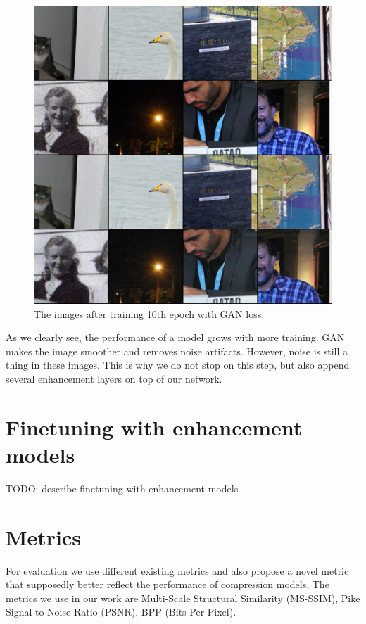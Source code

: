 \begin{figure}
    \centering
    \includegraphics[width=\textwidth]{figure/gan_14000.jpg}
    \caption{The images after training 10th epoch with GAN loss.}
    \label{gan-tenth-epoch}
\end{figure}

As we clearly see, the performance of a model grows with more training. GAN makes the image smoother and removes noise artifacts. However, noise is still a thing in these images. This is why we do not stop on this step, but also append several enhancement layers on top of our network.

\section{Finetuning with enhancement models}

TODO: describe finetuning with enhancement models

\section{Metrics}

For evaluation we use different existing metrics and also propose a novel metric that supposedly better reflect the performance of compression models. The metrics we use in our work are Multi-Scale Structural Similarity (MS-SSIM), Pike Signal to Noise Ratio (PSNR), BPP (Bits Per Pixel).

